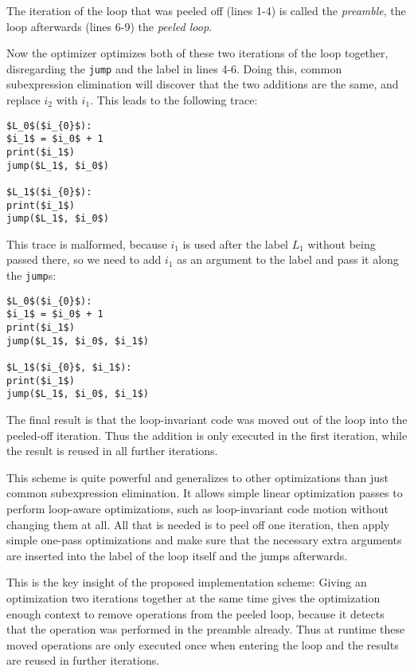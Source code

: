 \documentclass[preprint]{sigplanconf}
\begin{document}
The iteration of the loop that was peeled off (lines 1-4) is called the
\emph{preamble}, the loop afterwards (lines 6-9) the \emph{peeled loop}.

Now the optimizer optimizes both of these two iterations of the loop together,
disregarding the \lstinline{jump} and the label in lines 4-6. Doing this, common
subexpression elimination will discover that the two additions are the same, and
replace $i_2$ with $i_1$. This leads to the following trace:

\begin{lstlisting}[mathescape,numbers = right,basicstyle=\setstretch{1.05}\ttfamily\scriptsize]
$L_0$($i_{0}$):
$i_1$ = $i_0$ + 1
print($i_1$)
jump($L_1$, $i_0$)

$L_1$($i_{0}$):
print($i_1$)
jump($L_1$, $i_0$)
\end{lstlisting}

This trace is malformed, because $i_1$ is used after the label $L_1$ without
being passed there, so we need to add $i_1$ as an argument to the label and pass
it along the \lstinline{jump}s:

\begin{lstlisting}[mathescape,numbers = right,basicstyle=\setstretch{1.05}\ttfamily\scriptsize]
$L_0$($i_{0}$):
$i_1$ = $i_0$ + 1
print($i_1$)
jump($L_1$, $i_0$, $i_1$)

$L_1$($i_{0}$, $i_1$):
print($i_1$)
jump($L_1$, $i_0$, $i_1$)
\end{lstlisting}

The final result is that the loop-invariant code was moved out of the loop into
the peeled-off iteration. Thus the addition is only executed in the first
iteration, while the result is reused in all further iterations.

This scheme is quite powerful and generalizes to other optimizations than just
common subexpression elimination. It allows simple linear optimization passes to
perform loop-aware optimizations, such as loop-invariant code motion without
changing them at all. All that is needed is to peel off one iteration, then
apply simple one-pass optimizations and make sure that the necessary extra
arguments are inserted into the label of the loop itself and the jumps
afterwards.

This is the key insight of the proposed implementation scheme: Giving an
optimization two iterations together at the same time gives the optimization
enough context to remove operations from the peeled loop, because it detects
that the operation was performed in the preamble already. Thus at runtime these
moved operations are only executed once when entering the loop and the results
are reused in further iterations.
\end{document}
